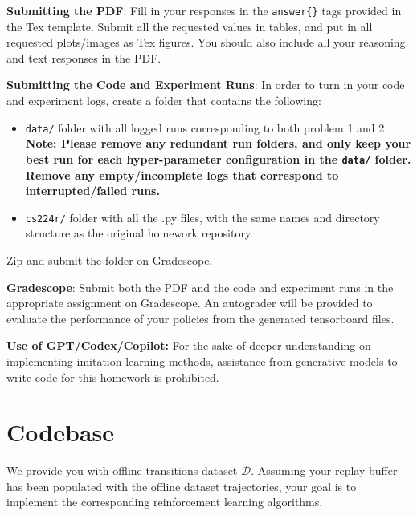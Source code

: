 \documentclass[12pt]{article}
\begin{document}
\vspace{0.2cm}
\noindent\textbf{Submitting the PDF}: Fill in your responses in the \texttt{answer\{\}} tags provided in the Tex template. Submit all the requested values in tables, and put in all requested plots/images as Tex figures. You should also include all your reasoning and text responses in the PDF.

\vspace{0.2cm}

\noindent\textbf{Submitting the Code and Experiment Runs}: In order to turn in your code and experiment logs, create a folder that contains the following:

\begin{itemize}
\item \texttt{data/} folder with all logged runs corresponding to both problem 1 and 2. \textbf{Note: Please remove any redundant run folders, and only keep your best run for each hyper-parameter configuration in the \texttt{data/} folder. Remove any empty/incomplete logs that correspond to interrupted/failed runs.}

\item \texttt{cs224r/} folder with all the .py files, with the same names and directory structure as the original homework repository. 
\end{itemize} 

Zip and submit the folder on Gradescope.
\vspace{0.2cm}

\noindent\textbf{Gradescope}: Submit both the PDF and the code and experiment runs in the appropriate assignment on Gradescope. An autograder will be provided to evaluate the performance of your policies from the generated tensorboard files. 

\vspace{0.2cm}

\noindent\textbf{Use of GPT/Codex/Copilot:} For the sake of deeper understanding on implementing imitation learning methods, assistance from generative models to write code for this homework is prohibited. 



\section*{Codebase}

We provide you with offline transitions dataset $\mathcal{D}$. Assuming your replay buffer has been populated with the offline dataset trajectories, your goal is to implement the corresponding reinforcement learning algorithms.
\end{document}
